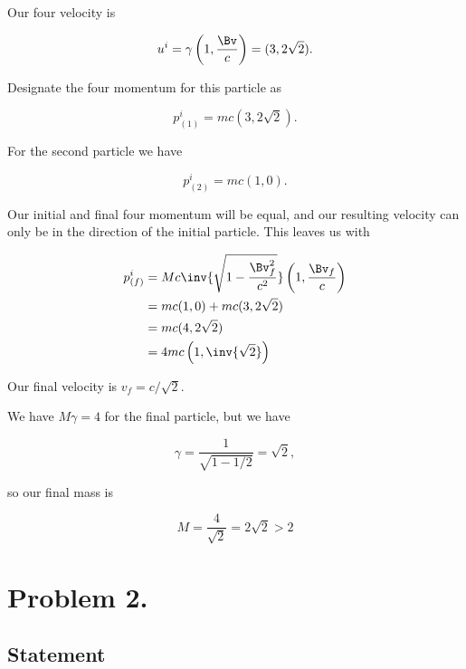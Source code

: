 Our four velocity is

\begin{equation}\label{eqn:relElectroDynProblemSet2:50}
u^i
= \gamma \left( 1, \frac{\Bv}{c} \right) = ( 3, 2 \sqrt{2} ).
\end{equation}

Designate the four momentum for this particle as

\begin{equation}\label{eqn:relElectroDynProblemSet2:70}
p_{(1)}^i = m c ( 3, 2 \sqrt{2} ).
\end{equation}

For the second particle we have

\begin{equation}\label{eqn:relElectroDynProblemSet2:90}
p_{(2)}^i = m c ( 1, 0 ).
\end{equation}

Our initial and final four momentum will be equal, and our resulting velocity can only be in the direction of the initial particle.  This leaves us with

\begin{align*}
p_{(f)}^i
&= M c \inv{\sqrt{1 - \frac{\Bv_f^2}{c^2}}} \left( 1, \frac{\Bv_f}{c} \right) \\
&= m c ( 1, 0 ) + m c ( 3, 2 \sqrt{2} )  \\
&= m c ( 4, 2 \sqrt{2} ) \\
&= 4 m c \left( 1, \inv{\sqrt{2}} \right)
\end{align*}

Our final velocity is $v_f = c/\sqrt{2}$.

We have $M \gamma = 4$ for the final particle, but we have

\begin{equation}\label{eqn:relElectroDynProblemSet2:110}
\gamma = \frac{1}{\sqrt{1 - 1/2}} = \sqrt{2},
\end{equation}

so our final mass is

\begin{equation}\label{eqn:relElectroDynProblemSet2:130}
M = \frac{4}{\sqrt{2}} = 2 \sqrt{2} > 2
\end{equation}

\section{Problem 2.}
\subsection{Statement}

